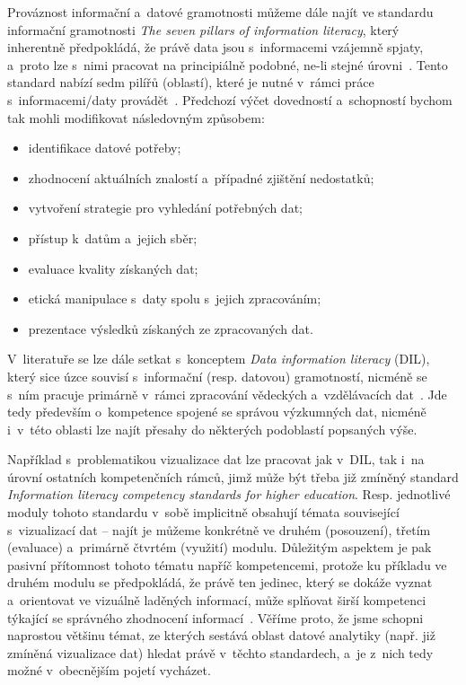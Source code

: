 Prováznost informační a~datové gramotnosti můžeme dále najít ve standardu informační gramotnosti \emph{The seven pillars of information literacy}, který inherentně předpokládá, že právě data jsou s~informacemi vzájemně spjaty, a~proto lze s~nimi pracovat na principiálně podobné, ne-li stejné úrovni~\parencite[126]{calzada13}. Tento standard nabízí sedm pilířů (oblastí), které je nutné v~rámci práce s~informacemi/daty provádět~\parencite{sconul11}. Předchozí výčet dovedností a~schopností bychom tak mohli modifikovat následovným způsobem:

\begin{itemize}
\tightlist
\item
  identifikace datové potřeby;
\item
  zhodnocení aktuálních znalostí a~případné zjištění nedostatků;
\item
  vytvoření strategie pro vyhledání potřebných dat;
\item
  přístup k~datům a~jejich sběr;
\item
  evaluace kvality získaných dat;
\item
  etická manipulace s~daty spolu s~jejich zpracováním;
\item
  prezentace výsledků získaných ze zpracovaných dat.
\end{itemize}

V~literatuře se lze dále setkat s~konceptem \emph{Data information literacy} (DIL), který sice úzce souvisí s~informační (resp. datovou) gramotností, nicméně se s~ním pracuje primárně v~rámci zpracování vědeckých a~vzdělávacích dat~\parencite{jeffryes13}. Jde tedy především o~kompetence spojené se správou výzkumných dat, nicméně i~v~této oblasti lze najít přesahy do některých podoblastí popsaných výše.

Například s~problematikou vizualizace dat lze pracovat jak v~DIL, tak i~na úrovní ostatních kompetenčních rámců, jimž může být třeba již zmíněný standard \emph{Information literacy competency standards for higher education}. Resp. jednotlivé moduly tohoto standardu v~sobě implicitně obsahují témata související s~vizualizací dat -- najít je můžeme konkrétně ve druhém (posouzení), třetím (evaluace) a~primárně čtvrtém (využití) modulu. Důležitým aspektem je pak pasivní přítomnost tohoto tématu napříč kompetencemi, protože ku příkladu ve druhém modulu se předpokládá, že právě ten jedinec, který se dokáže vyznat a~orientovat ve vizuálně laděných informací, může splňovat širší kompetenci týkající se správného zhodnocení informací~\parencite{womack14}. Věříme proto, že jsme schopni naprostou většinu témat, ze kterých sestává oblast datové analytiky (např. již zmíněná vizualizace dat) hledat právě v~těchto standardech, a~je z~nich tedy možné v~obecnějším pojetí vycházet.

